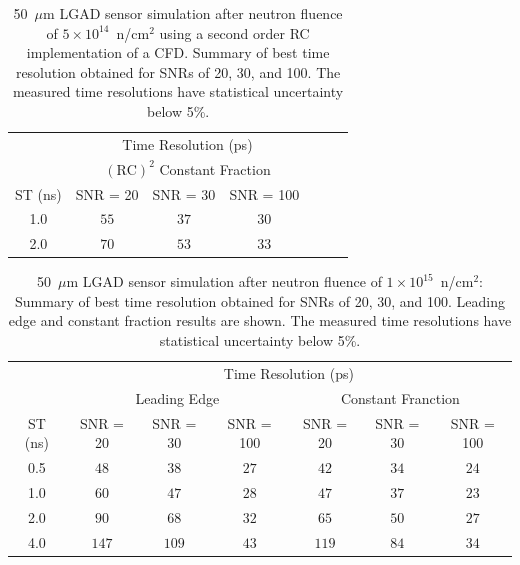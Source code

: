 \documentclass[preprint,1p]{elsarticle}
\begin{document}
 \begin{table}
    \begin{center}
     \begin{tabular}{c|ccc|ccc}
     \multicolumn{1}{c}{}& \multicolumn{3}{c}{Time Resolution (ps)} \\
     \multicolumn{1}{c}{}& \multicolumn{3}{c}{$\mathrm{(RC)}^{2}$ Constant Fraction}\\ \hline
     ST (ns) & SNR = 20      & SNR = 30      & SNR = 100 \\
     1.0 & $55$  & $ 37$  & $30$ \\
     2.0 & $70$  & $ 53$  & $33$ \\     
     \end{tabular}
     \end{center}
     \caption{50~$\mu$m LGAD sensor simulation after neutron fluence of
      $5\times 10^{14}$~n/cm$^2$ using a second order RC implementation of a CFD. 
      Summary of best time resolution obtained for SNRs
     of 20, 30, and 100. The measured time resolutions
    have statistical uncertainty below 5\%.}
\label{tab:shaping_time_5e14_psCFD}
  \end{table}




  \begin{table}
      \begin{tabular}{c|ccc|ccc}
      \multicolumn{1}{c}{}& \multicolumn{6}{c}{Time Resolution (ps)} \\
      \multicolumn{1}{c}{}&\multicolumn{3}{c}{Leading Edge} & \multicolumn{3}{c}{Constant Franction}\\ \hline
      ST (ns) & SNR = 20   & SNR = 30      & SNR = 100     & SNR = 20      & SNR = 30      & SNR = 100 \\
      0.5 & $48$    & $38$    & $27$  & $42$    & $34$  & $24$ \\
      1.0 & $60$    & $47$    & $28$  & $47$    & $37$  & $23$ \\
      2.0 & $90$    & $68$    & $32$  & $65$    & $50$  & $27$ \\
      4.0 & $147$  & $109$  & $43$  & $119$  & $84$  & $34$ \\
      \end{tabular}
      \caption{50~$\mu$m LGAD sensor simulation after neutron fluence of
       $1\times 10^{15}$~n/cm$^2$: Summary of best time resolution obtained for SNRs
      of 20, 30, and 100. Leading edge and constant fraction results are shown. The measured time resolutions
    have statistical uncertainty below 5\%.}
\label{tab:shaping_time_1e_15}
   \end{table}
\end{document}
